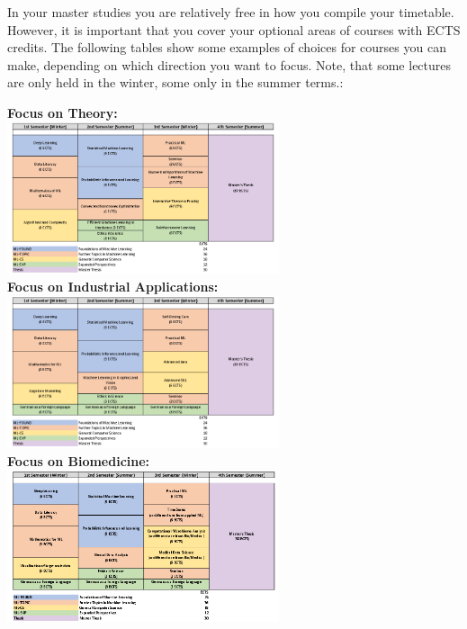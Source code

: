 In your master studies you are relatively free in how you compile your timetable. However, it is important that you cover your optional areas of courses with ECTS credits. 
The following tables show some examples of choices for courses you can make, depending on which direction you want to focus. Note, that some lectures are only held in the winter,
some only in the summer terms.:

\begin{center}
\textbf{Focus on Theory:} \\
\includegraphics[width=0.6\textwidth]{media/ML_Theorie}\\
\textbf{Focus on Industrial Applications:} \\
\includegraphics[width=0.6\textwidth]{media/ML_Praktisch}\\
\newpage
\textbf{Focus on Biomedicine:} \\
\includegraphics[width=0.6\textwidth]{media/ML_Biomed}\\
\end{center}

